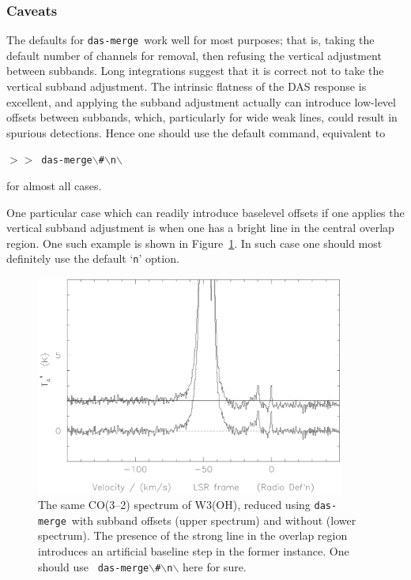 \documentclass[11pt,twoside]{article}
\newcommand{\dm}{{\tt das-merge}}
\newcommand{\SP}{{$>\!>$}}
\begin{document}
\subsubsection{Caveats}
The defaults for \dm\ work well for most purposes; that is, taking the
default number of channels for removal, then refusing the vertical
adjustment between subbands. Long integrations suggest that it
is correct not to take the vertical subband adjustment.  The intrinsic
flatness of the DAS response is excellent, and applying the subband
adjustment actually can introduce low-level offsets between subbands,
which, particularly for wide weak lines, could result in spurious
detections.  Hence one should use the default command, equivalent to

\SP\ {\tt das-merge$\backslash$\#$\backslash$n$\backslash$}

for almost all cases.

One particular case which can readily introduce baselevel offsets if one
applies the vertical subband adjustment is when one has a bright line
in the central overlap region. One such example is shown in
Figure~\ref{fig:dasmerge_yn}. In such case one should most definitely
use the default `{\tt{n}}' option.
%
\begin{figure}[ht]
\centering
\includegraphics[width=4.0in]{sc8_dasmerge_yn.ps}
\vspace*{-0.5cm}
\begin{center}
\begin{minipage}[t]{5in}
\caption[\dm ; yes or no]
{\small{The same CO(3--2) spectrum of W3(OH), reduced using \dm\ with
subband offsets (upper spectrum) and without (lower spectrum). The
presence of the strong line in the overlap region introduces an
artificial baseline step in the former instance. One should use {\tt
das-merge$\backslash$\#$\backslash$n$\backslash$} here for sure.  }}
\label{fig:dasmerge_yn}
\end{minipage}
\end{center}
\end{figure}
\end{document}
